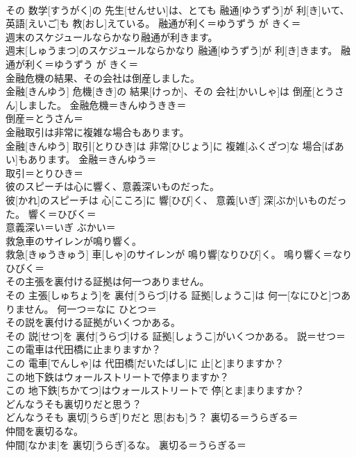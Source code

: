 \documentclass[8pt]{extreport}
\begin{document}
\begin{CJK}{UTF8}{min}
\\	その 数学[すうがく]の 先生[せんせい]は、とても 融通[ゆうずう]が 利[き]いて、 英語[えいご]も 教[おし]えている。	融通が利く＝ゆうずう が きく＝ 
\\	週末のスケジュールならかなり融通が利きます。	
\\	週末[しゅうまつ]のスケジュールならかなり 融通[ゆうずう]が 利[き]きます。	融通が利く＝ゆうずう が きく＝ 
\\	金融危機の結果、その会社は倒産しました。	
\\	金融[きんゆう] 危機[きき]の 結果[けっか]、その 会社[かいしゃ]は 倒産[とうさん]しました。	金融危機＝きんゆうきき＝ 
\\	倒産＝とうさん＝ 
\\	金融取引は非常に複雑な場合もあります。	
\\	金融[きんゆう] 取引[とりひき]は 非常[ひじょう]に 複雑[ふくざつ]な 場合[ばあい]もあります。	金融＝きんゆう＝ 
\\	取引＝とりひき＝ 
\\	彼のスピーチは心に響く、意義深いものだった。	
\\	彼[かれ]のスピーチは 心[こころ]に 響[ひび]く、 意義[いぎ] 深[ぶか]いものだった。	響く＝ひびく＝ 
\\	意義深い＝いぎ ぶかい＝ 
\\	救急車のサイレンが鳴り響く。	
\\	救急[きゅうきゅう] 車[しゃ]のサイレンが 鳴り響[なりひび]く。	鳴り響く＝なりひびく＝ 
\\	その主張を裏付ける証拠は何一つありません。	
\\	その 主張[しゅちょう]を 裏付[うらづ]ける 証拠[しょうこ]は 何一[なにひと]つありません。	何一つ＝なに ひとつ＝ 
\\	その説を裏付ける証拠がいくつかある。	
\\	その 説[せつ]を 裏付[うらづ]ける 証拠[しょうこ]がいくつかある。	説＝せつ＝ 
\\	この電車は代田橋に止まりますか？	
\\	この 電車[でんしゃ]は 代田橋[だいたばし]に 止[と]まりますか？	
\\	この地下鉄はウォールストリートで停まりますか？	
\\	この 地下鉄[ちかてつ]はウォールストリートで 停[とま]まりますか？	
\\	どんなうそも裏切りだと思う？	
\\	どんなうそも 裏切[うらぎ]りだと 思[おも]う？	裏切る＝うらぎる＝ 
\\	仲間を裏切るな。	
\\	仲間[なかま]を 裏切[うらぎ]るな。	裏切る＝うらぎる＝ 

\end{CJK}
\end{document}
